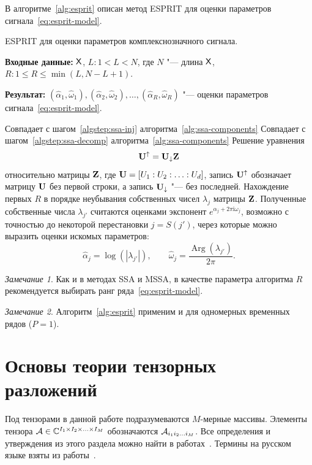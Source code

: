 \documentclass[specialist,
  substylefile=spbu_report.rtx,
subf,href,colorlinks=true, 12pt]{disser}
\theoremstyle{plain}
\theoremstyle{definition}
\theoremstyle{remark}
\newtheorem{remark}{Замечание}[section]
\newcommand{\Input}{\textbf{Входные данные: }}
\newcommand{\Output}{\textbf{Результат: }}
\newcommand{\iu}{\mathrm{i}}
\begin{document}
В алгоритме~\ref{alg:esprit} описан метод ESPRIT для оценки параметров
сигнала~\eqref{eq:esprit-model}.
\begin{algorithm}[!ht]
  \caption{ESPRIT для оценки параметров комплекснозначного сигнала.}
  \label{alg:esprit}
  \Input $\mathsf{X}$, $L: 1 < L < N$, где $N$ "--- длина $\mathsf{X}$, $R: 1
  \leqslant R\leqslant \min(L, N-L+1)$.

  \Output $\left(\widehat{\alpha}_1, \widehat{\omega}_1\right),
  \left(\widehat{\alpha}_2, \widehat{\omega}_2\right), \ldots,
  \left(\widehat{\alpha}_R, \widehat{\omega}_R\right)$ "--- оценки параметров
  сигнала~\eqref{eq:esprit-model}.
  \begin{algorithmic}[1]
    \State Совпадает с шагом~\ref{algstep:ssa-inj}
    алгоритма~\ref{alg:ssa-components}
    \State Совпадает с шагом~\ref{algstep:ssa-decomp}
    алгоритма~\ref{alg:ssa-components}
    \State Решение уравнения
    \[
      \mathbf{U}^{\uparrow}=\mathbf{U}_{\downarrow}\mathbf{Z}
    \]
    относительно матрицы $\mathbf{Z}$, где $\mathbf{U} = [U_1:U_2:\ldots: U_d]$,
    запись $\mathbf{U}^{\uparrow}$ обозначает матрицу $\mathbf{U}$ без первой строки, а
    запись $\mathbf{U}_{\downarrow}$ "--- без последней.
    \State Нахождение первых $R$ в порядке неубывания собственных
    чисел $\lambda_j$ матрицы $\mathbf{Z}$.
    Полученные собственные числа $\lambda_{j'}$ считаются оценками
    экспонент $e^{\alpha_j + 2\pi\iu \omega_j}$, возможно с точностью
    до некоторой перестановки
    $j = S (j')$, через которые можно выразить
    оценки искомых параметров:
    \[
      \widehat{\alpha}_j = \log\left(\left|\lambda_{j'}\right|\right), \qquad
      \widehat{\omega}_j =
      \frac{\operatorname{Arg}\left(\lambda_{j'}\right)}{2 \pi}.
    \]
  \end{algorithmic}
\end{algorithm}
\begin{remark}
  Как и в методах SSA и MSSA, в качестве параметра алгоритма $R$
  рекомендуется выбирать ранг
  ряда~\eqref{eq:esprit-model}.
\end{remark}
\begin{remark}
  Алгоритм~\ref{alg:esprit} применим и для одномерных временных рядов ($P=1$).
\end{remark}

\section{Основы теории тензорных разложений}\label{sec:tensor-decompositions}
Под тензорами в данной работе подразумеваются $M$-мерные массивы.
Элементы тензора $\mathcal{A} \in \mathbb{C}^{I_1 \times I_2 \times \ldots \times
I_M}$ обозначаются
$\mathcal{A}_{i_1 i_2 \ldots i_M}$.
Все определения и утверждения из этого раздела можно найти в
работах~\cite{hosvd, tensor-bg, tensor-bg2, tensor-bg3}.
Термины на русском языке взяты из работы~\cite{tensor-rus}.
\end{document}
